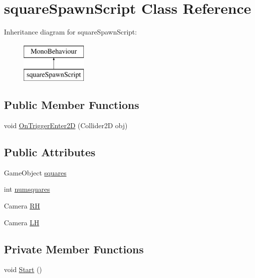 \hypertarget{classsquare_spawn_script}{}\section{square\+Spawn\+Script Class Reference}
\label{classsquare_spawn_script}
Inheritance diagram for square\+Spawn\+Script\+:\begin{figure}[H]
\begin{center}
\leavevmode
\includegraphics[height=2.000000cm]{classsquare_spawn_script}
\end{center}
\end{figure}
\subsection*{Public Member Functions}
\begin{DoxyCompactItemize}
\item 
void \hyperlink{classsquare_spawn_script_a072454e82d37b10169a363717acfc2be}{On\+Trigger\+Enter2\+D} (Collider2\+D obj)
\end{DoxyCompactItemize}
\subsection*{Public Attributes}
\begin{DoxyCompactItemize}
\item 
Game\+Object \hyperlink{classsquare_spawn_script_a353637659973cde399b46b194b30eb2e}{squares}
\item 
int \hyperlink{classsquare_spawn_script_aee81b01036a29f961a113a21183173e3}{numsquares}
\item 
Camera \hyperlink{classsquare_spawn_script_acc39770a5d684a4b5e1057b832dc979d}{R\+H}
\item 
Camera \hyperlink{classsquare_spawn_script_abf8f64837c29453bfe6231d48b06b483}{L\+H}
\end{DoxyCompactItemize}
\subsection*{Private Member Functions}
\begin{DoxyCompactItemize}
\item 
void \hyperlink{classsquare_spawn_script_adfc7e870640ae864df5da2c89c275c21}{Start} ()
\end{DoxyCompactItemize}


